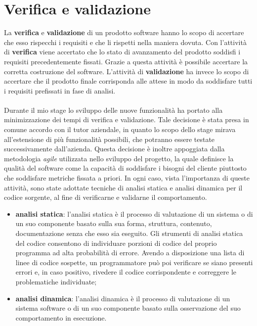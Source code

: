
\chapter{Verifica e validazione}
\label{cap:verifica}
La \textbf{verifica} e \textbf{validazione} di un prodotto software hanno lo scopo di accertare che esso rispecchi i requisiti e che li rispetti nella maniera dovuta. Con l’attività di \textbf{verifica} viene accertato che lo stato di avanzamento del prodotto soddisfi i requisiti precedentemente fissati. Grazie a questa attività è possibile accertare la corretta costruzione del software. L’attività di \textbf{validazione} ha invece lo scopo di accertare che il prodotto finale corrisponda alle attese in modo da soddisfare tutti i requisiti prefissati in fase di analisi.\\ \\
Durante il mio stage lo sviluppo delle nuove funzionalità ha portato alla minimizzazione dei tempi di verifica e validazione. Tale decisione è stata presa in comune accordo con il tutor aziendale, in quanto lo scopo dello stage mirava all’estensione di più funzionalità possibili, che potranno essere testate successivamente dall’azienda.
Questa decisione è inoltre appoggiata dalla metodologia \emph{agile} utilizzata nello sviluppo del progetto, la quale definisce la qualità del software come la capacità di soddisfare i bisogni del cliente piuttosto che soddisfare metriche fissata a priori.
In ogni caso, vista l'importanza di queste attività, sono state adottate tecniche di analisi statica e analisi dinamica per il codice sorgente, al fine di verificarne e validarne il comportamento.
\begin{itemize}
	\item \textbf{analisi statica}: l'analisi statica è il processo di valutazione di un sistema o di un suo componente basato sulla sua forma, struttura, contenuto, documentazione senza che esso sia eseguito. Gli strumenti di analisi statica del codice consentono di individuare porzioni di codice del proprio programma ad alta probabilità di errore. Avendo a disposizione una lista di linee di codice sospette, un programmatore può poi verificare se siano presenti errori e, in caso positivo, rivedere il codice corrispondente e correggere le problematiche individuate;
	\item \textbf{analisi dinamica}: l'analisi dinamica è il processo di valutazione di un sistema software o di un suo componente basato sulla osservazione del suo comportamento in esecuzione.
\end{itemize}


